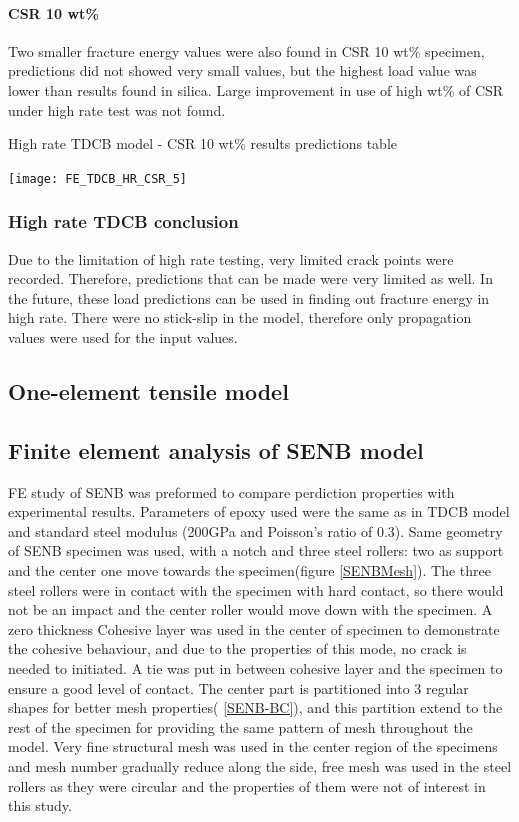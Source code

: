 \documentclass[numbers=noendperiod,chapterprefix=on]{icldt} %
\begin{document}
{\paragraph{CSR 10 wt\%}  
 Two smaller fracture energy values were also found in CSR 10 wt\% specimen, predictions did not showed very small values, but the highest load value was lower than results found in silica.  Large improvement in use of high wt\% of CSR under high rate test was not found.   
     
  \begin{table}[!htpb]
   \centering
   \caption{High rate TDCB model - CSR 10 wt\% results predictions table}\label{FE_TDCB_HR_CSR_10}
   \texttt{[image: FE\_TDCB\_HR\_CSR\_5]}
   \end{table}
   \FloatBarrier    
       
\subsubsection{High rate TDCB conclusion}     
Due to the limitation of high rate testing, very limited crack points were recorded. Therefore, predictions that can be made were very limited as well.
In the future, these load predictions can be used in finding out fracture energy in high rate.
There were no stick-slip in the model, therefore only propagation values were used for the input values.    

\subsection{One-element tensile model} \label{FE_tensile_model}

\subsection{Finite element analysis of SENB model}
FE study of SENB was preformed to compare perdiction properties with experimental results. Parameters of epoxy used were the same as in TDCB model and standard steel modulus (200GPa and Poisson's ratio of 0.3). Same geometry of SENB specimen was used, with a notch and three steel rollers: two as support and the center one move towards the specimen(figure \ref{SENBMesh}). The three steel rollers were in contact with the specimen with hard contact, so there would not be an impact and the center roller would move down with the specimen. A zero thickness Cohesive layer was used in the center of specimen to demonstrate the cohesive behaviour, and due to the properties of this mode, no crack is needed to initiated. A tie was put in between cohesive layer and the specimen to ensure a good level of contact.
The center part is partitioned into 3 regular shapes for better mesh properties( \ref{SENB-BC}), and this partition extend to the rest of the specimen for providing the same pattern of mesh throughout the model. Very fine structural mesh was used in the center region of the specimens and mesh number gradually reduce along the side, free mesh was used in the steel rollers as they were circular and the properties of them were not of interest in this study.

}
\end{document}
